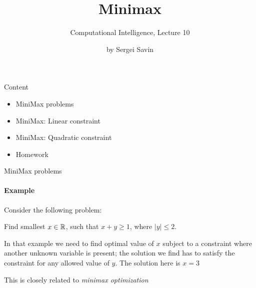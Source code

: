 \documentclass{beamer}
\title{ Minimax }
\subtitle{Computational Intelligence, Lecture 10}
\author{by Sergei Savin}
\date{\mydate}
\begin{document}
\maketitle



\begin{frame}{Content}

\begin{itemize}
 \item MiniMax problems
 \item MiniMax: Linear constraint
 \item MiniMax: Quadratic constraint
\item Homework
\end{itemize}

\end{frame}



\begin{frame}{MiniMax problems}
\framesubtitle{Example}
\begin{flushleft}

Consider the following problem: 

\begin{example}
Find smallest $x \in \mathbb{R}$, such that $x + y \geq 1$, where $|y| \leq 2$.
\end{example}

\bigskip

In that example we need to find optimal value of $x$ subject to a constraint where another unknown variable is present; the solution we find has to satisfy the constraint for any allowed value of $y$. The solution here is $x = 3$

\bigskip

This is closely related to \emph{minimax optimization}
 
\end{flushleft}
\end{frame}
\end{document}
